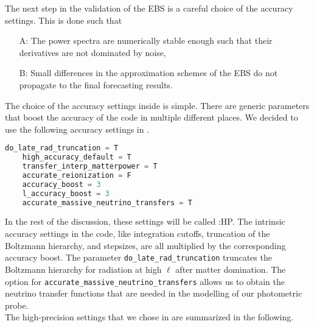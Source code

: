 \documentclass[../main.tex]{subfiles}
\begin{document}
The next step in the validation of the EBS is a careful choice of the accuracy settings. This is done such that \begin{enumerate}
    \item[A:] The power spectra are numerically stable enough such that their derivatives are not dominated by noise,
    \item[B:] Small differences in the approximation schemes of the EBS do not propagate to the final forecasting results.   
\end{enumerate} The choice of the accuracy settings inside \camb is simple. There are generic parameters that boost the accuracy of the \camb code in multiple different places.
We decided to use the following accuracy settings in \camb.  
\begin{lstlisting}[language=Python,caption=\camb:HP precision settings]
    do_late_rad_truncation = T
    high_accuracy_default = T
    transfer_interp_matterpower = T
    accurate_reionization = F
    accuracy_boost = 3
    l_accuracy_boost = 3
    accurate_massive_neutrino_transfers = T
\end{lstlisting} 
In the rest of the discussion, these settings will be called \camb:HP. The intrinsic accuracy settings in the code, like integration cutoffs, truncation of the Boltzmann hierarchy, and stepsizes, are all multiplied by the corresponding accuracy boost. The parameter {\tt do\_late\_rad\_truncation} truncates the Boltzmann hierarchy for radiation at high $\ell$ after matter domination. The option for {\tt accurate\_massive\_neutrino\_transfers} allows us to obtain the neutrino transfer functions that are needed in the modelling of our photometric probe.\\
The high-precision settings that we chose in \class are summarized in the following.
\end{document}
